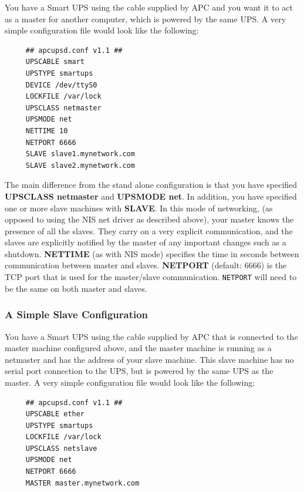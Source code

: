 \label{index-Configuration_002c-Master-74}
\label{index-Master_002c-config-example-75}
\label{index-Example_002c-Master-conf-76}
You have a Smart UPS using the cable supplied by APC and you want it to act as
a master for another computer, which is powered by the same UPS. A very simple
configuration file would look like the following: 

\footnotesize
\begin{verbatim}
     ## apcupsd.conf v1.1 ##
     UPSCABLE smart
     UPSTYPE smartups
     DEVICE /dev/ttyS0
     LOCKFILE /var/lock
     UPSCLASS netmaster
     UPSMODE net
     NETTIME 10
     NETPORT 6666
     SLAVE slave1.mynetwork.com
     SLAVE slave2.mynetwork.com
\end{verbatim}
\normalsize

The main difference from the stand alone configuration is that you
have specified \textbf{UPSCLASS netmaster} and \textbf{UPSMODE net}.  In
addition, you have specified one or more slave machines with
\textbf{SLAVE}\@.  In this mode of networking, (as opposed to using the
NIS net driver as described above), your master knows the
presence of all the slaves.  They carry on a very explicit communication,
and the slaves are explicitly notified by the master of any important
changes such as a shutdown.   \textbf{NETTIME} (as with NIS mode)
specifies the time in seconds between communication between master and
slaves.  \textbf{NETPORT} (default: 6666) is the TCP port that is used
for the master/slave communication.  \texttt{NETPORT} will need to be the
same on both master and slaves.

\label{A-Simple-Slave-Configuration}

\subsubsection*{A Simple Slave Configuration}

\label{index-Slave-Configuration-77}
\label{index-Configuration_002c-Slave-78}
\label{index-Example_002c-Slave-conf-79}
You have a Smart UPS using the cable supplied by APC that is connected to the
master machine configured above, and the master machine is running as a
netmaster and has the address of your slave machine.  This slave machine has
no serial port connection to the UPS, but is powered by the same UPS as the
master.  A very simple configuration file would look like the following: 

\footnotesize
\begin{verbatim}
     ## apcupsd.conf v1.1 ##
     UPSCABLE ether
     UPSTYPE smartups
     LOCKFILE /var/lock
     UPSCLASS netslave
     UPSMODE net
     NETPORT 6666
     MASTER master.mynetwork.com
\end{verbatim}
\normalsize


